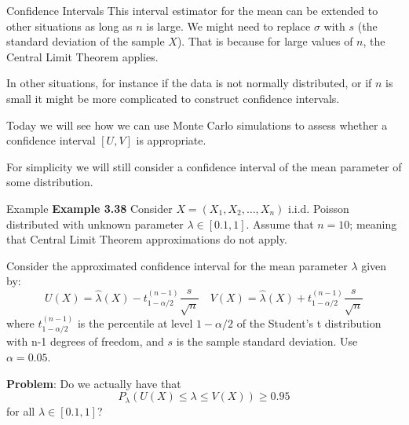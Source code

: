 \documentclass[8pt]{beamer}
\begin{document}
\begin{frame}{Confidence Intervals}
This interval estimator for the mean can be extended to other situations as long as $n$ is large. We might need to replace $\sigma$ with $s$ (the standard deviation of the sample $X$). That is because for large values of $n$, the Central Limit Theorem applies.
\vspace{3mm} 

In other situations, for instance if the data is not normally distributed, or if $n$ is small it might be more complicated to construct confidence intervals.
\vspace{3mm} 

Today we will see how we can use Monte Carlo simulations to assess whether a confidence interval $[U,V]$ is appropriate.
\vspace{3mm} 

For simplicity we will still consider a confidence interval of the mean parameter of some distribution.
\end{frame}

\begin{frame}{Example}
\textbf{Example 3.38} Consider $X=(X_1,X_2, \ldots, X_n)$ i.i.d. Poisson distributed with unknown parameter $\lambda \in [0.1,1]$. Assume that $n=10$; meaning that Central Limit Theorem approximations do not apply.

\vspace{3mm} 

Consider the approximated confidence interval for the mean parameter $\lambda$ given by:
\begin{equation*}
U(X)=\hat{\lambda}(X)-t_{1-\alpha/2}^{(n-1)}  \frac{s}{\sqrt{n}} \quad V(X)=\hat{\lambda}(X)+t_{1-\alpha/2}^{(n-1)} \frac{s}{\sqrt{n}}
\end{equation*}
where $t_{1-\alpha/2}^{(n-1)}$ is the percentile at level $1-\alpha/2$ of the Student's t distribution with n-1 degrees of freedom, and $s$ is the sample standard deviation. Use $\alpha=0.05$.

\vspace{3mm} 

\textbf{Problem}: Do we actually have that 
\[P_\lambda(U(X)\leq \lambda \leq V(X)) \geq 0.95\]
for all $\lambda \in [0.1,1] $?
\end{frame}
\end{document}
